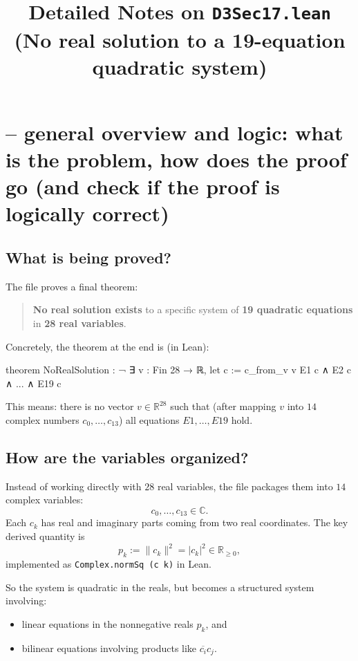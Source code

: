 \documentclass[11pt]{article}
\title{Detailed Notes on \texttt{D3Sec17.lean}\\(No real solution to a 19-equation quadratic system)}
\author{}
\date{}
\begin{document}
\maketitle

\section*{-- general overview and logic: what is the problem, how does the proof go (and check if the proof is logically correct)}

\subsection*{What is being proved?}

The file proves a final theorem:

\begin{quote}
\textbf{No real solution exists} to a specific system of \textbf{19 quadratic equations} in \textbf{28 real variables}.
\end{quote}

Concretely, the theorem at the end is (in Lean):

\begin{LeanCode}
theorem NoRealSolution : ¬ ∃ v : Fin 28 → ℝ,
  let c := c_from_v v
  E1 c ∧ E2 c ∧ ... ∧ E19 c
\end{LeanCode}

This means: there is no vector $v\in\mathbb{R}^{28}$ such that (after mapping $v$ into $14$ complex numbers $c_0,\dots,c_{13}$) all equations $E1,\dots,E19$ hold.

\subsection*{How are the variables organized?}

Instead of working directly with $28$ real variables, the file packages them into $14$ complex variables:
\[
c_0,\dots,c_{13}\in\mathbb{C}.
\]
Each $c_k$ has real and imaginary parts coming from two real coordinates.  The key derived quantity is
\[
p_k := \|c_k\|^2 = |c_k|^2 \in \mathbb{R}_{\ge 0},
\]
implemented as \texttt{Complex.normSq (c k)} in Lean.

So the system is quadratic in the reals, but becomes a structured system involving:
\begin{itemize}
\item linear equations in the nonnegative reals $p_k$, and
\item bilinear equations involving products like $\overline{c_i}c_j$.
\end{itemize}
\end{document}
